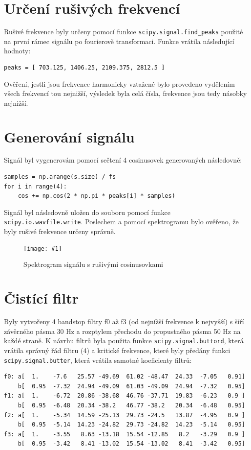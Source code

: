 \documentclass[11pt]{article}
\newcommand{\pic}[2]{
    \begin{figure}[h!]
    \centering
    \texttt{[image: \#1]}
    \caption{#2}
    \end{figure}
}
\begin{document}
\section{Určení rušivých frekvencí}
Rušivé frekvence byly určeny pomocí funkce \texttt{scipy.signal.find\_peaks} použité na první rámec signálu po fourierově transformaci.
Funkce vrátila následující hodnoty:
\begin{verbatim}
peaks = [ 703.125, 1406.25, 2109.375, 2812.5 ]
\end{verbatim}

Ověření, jestli jsou frekvence harmonicky vztažené bylo provedeno vydělením všech frekvencí tou nejnižší, výsledek byla celá čísla, frekvence jsou tedy násobky nejnižší.

\section{Generování signálu}
Signál byl vygenerovám pomocí sečtení 4 cosinusovek generovaných následovně:
\begin{verbatim}
samples = np.arange(s.size) / fs
for i in range(4):
    cos += np.cos(2 * np.pi * peaks[i] * samples)
\end{verbatim}

Signál byl následovně uložen do souboru pomocí funkce \texttt{scipy.io.wavfile.write}.
Poslechem a pomocí spektrogramu bylo ověřeno, že byly rušivé frekvence určeny správně.
\pic{img/6_spectrograph.png}{Spektrogram signálu s rušivými cosinusovkami}

\section{Čistící filtr}
Byly vytvořeny 4 bandstop filtry f0 až f3 (od nejnížší frekvence k nejvyšší) s šíří závěrného pásma 30 Hz a rozptylem přechodu do propustného pásma 50 Hz na každé straně. K návrhu filtrů byla použita funkce \texttt{scipy.signal.buttord}, která vrátila správný řád filtru (4) a kritické frekvence, které byly předány funkci \texttt{scipy.signal.butter}, která vrátila samotné koeficienty filtrů:
\begin{verbatim}
f0: a[  1.    -7.6   25.57 -49.69  61.02 -48.47  24.33  -7.05   0.91]
    b[  0.95  -7.32  24.94 -49.09  61.03 -49.09  24.94  -7.32   0.95]
f1: a[  1.    -6.72  20.86 -38.68  46.76 -37.71  19.83  -6.23   0.9 ]
    b[  0.95  -6.48  20.34 -38.2   46.77 -38.2   20.34  -6.48   0.95]
f2: a[  1.    -5.34  14.59 -25.13  29.73 -24.5   13.87  -4.95   0.9 ]
    b[  0.95  -5.14  14.23 -24.82  29.73 -24.82  14.23  -5.14   0.95]
f3: a[  1.    -3.55   8.63 -13.18  15.54 -12.85   8.2   -3.29   0.9 ] 
    b[  0.95  -3.42   8.41 -13.02  15.54 -13.02   8.41  -3.42   0.95]
\end{verbatim}
\end{document}
